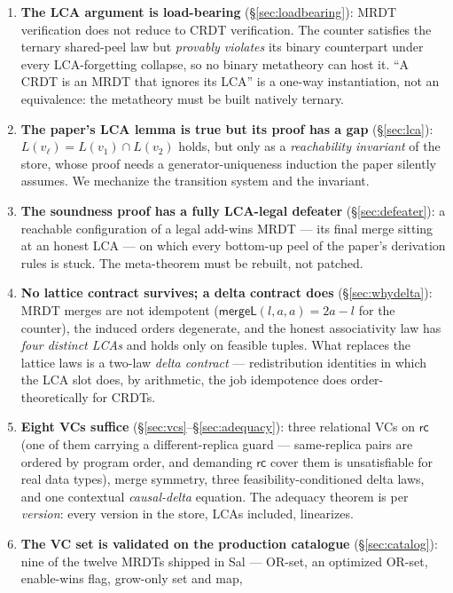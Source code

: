 \documentclass[11pt]{article}
\newcommand{\mergeL}{\mathsf{mergeL}}
\begin{document}
\begin{enumerate}[leftmargin=2em]
\item \textbf{The LCA argument is load-bearing}
  (\S\ref{sec:loadbearing}): MRDT verification does not reduce to CRDT
  verification. The counter satisfies the ternary shared-peel law but
  \emph{provably violates} its binary counterpart under every
  LCA-forgetting collapse, so no binary metatheory can host it. ``A CRDT
  is an MRDT that ignores its LCA'' is a one-way instantiation, not an
  equivalence: the metatheory must be built natively ternary.
\item \textbf{The paper's LCA lemma is true but its proof has a gap}
  (\S\ref{sec:lca}): $L(v_\ell) = L(v_1) \cap L(v_2)$ holds, but only as a
  \emph{reachability invariant} of the store, whose proof needs a
  generator-uniqueness induction the paper silently assumes. We mechanize
  the transition system and the invariant.
\item \textbf{The soundness proof has a fully LCA-legal defeater}
  (\S\ref{sec:defeater}): a reachable configuration of a legal add-wins
  MRDT --- its final merge sitting at an honest LCA --- on which every
  bottom-up peel of the paper's derivation rules is stuck. The
  meta-theorem must be rebuilt, not patched.
\item \textbf{No lattice contract survives; a delta contract does}
  (\S\ref{sec:whydelta}): MRDT merges are not idempotent
  ($\mergeL(l,a,a)=2a-l$ for the counter), the induced orders degenerate,
  and the honest associativity law has \emph{four distinct LCAs} and holds
  only on feasible tuples. What replaces the lattice laws is a two-law
  \emph{delta contract} --- redistribution identities in which the LCA
  slot does, by arithmetic, the job idempotence does order-theoretically
  for CRDTs.
\item \textbf{Eight VCs suffice} (\S\ref{sec:vcs}--\S\ref{sec:adequacy}):
  three relational VCs on $\mathsf{rc}$ (one of them carrying a
  different-replica guard --- same-replica pairs are ordered by program
  order, and demanding $\mathsf{rc}$ cover them is unsatisfiable for
  real data types), merge symmetry, three
  feasibility-conditioned delta laws, and one contextual \emph{causal-delta}
  equation. The adequacy theorem is per \emph{version}: every version in
  the store, LCAs included, linearizes.
\item \textbf{The VC set is validated on the production catalogue}
  (\S\ref{sec:catalog}): nine of the twelve MRDTs shipped in Sal ---
  OR-set, an optimized OR-set, enable-wins flag, grow-only set and map,

\end{enumerate}
\end{document}
